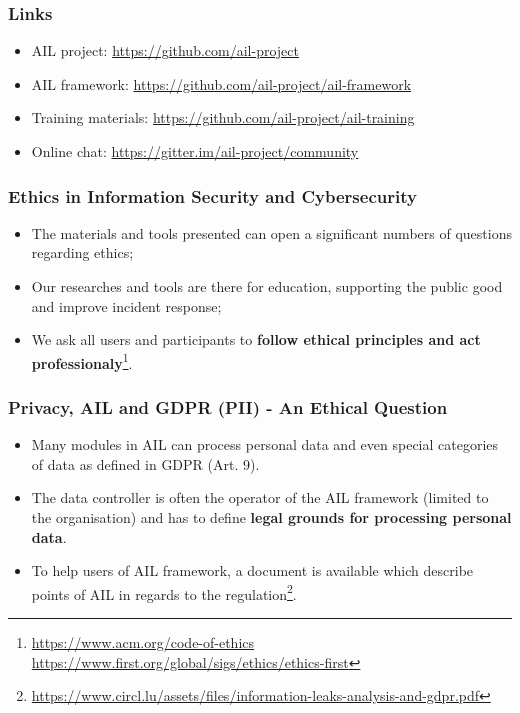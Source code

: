 \documentclass{beamer}
\begin{document}
\begin{frame}
\frametitle{Links}
    \begin{itemize}
        \item AIL project: \url{https://github.com/ail-project}
        \item AIL framework: \url{https://github.com/ail-project/ail-framework}
        \item Training materials: \url{https://github.com/ail-project/ail-training}
        \item Online chat: \url{https://gitter.im/ail-project/community}
    \end{itemize}
\end{frame}


\begin{frame}
        \frametitle{Ethics in Information Security and Cybersecurity}
        \begin{itemize}
        \item The materials and tools presented can open a significant numbers of questions regarding ethics;
        \item Our researches and tools are there for education, supporting the public good and improve incident response;
        \item We ask all users and participants to {\bf follow ethical principles and act professionaly}\footnote{\url{https://www.acm.org/code-of-ethics} \url{https://www.first.org/global/sigs/ethics/ethics-first}}.
        \end{itemize}
\end{frame}

\begin{frame}
        \frametitle{Privacy, AIL and GDPR (PII) - An Ethical Question}
        \begin{itemize}
                \item Many modules in AIL can process personal data and even special categories of data as defined in GDPR (Art. 9).
                \item The data controller is often the operator of the AIL framework (limited to the organisation) and has to define {\bf legal grounds for processing personal data}.
                \item To help users of AIL framework, a document is available which describe points of AIL in regards to the regulation\footnote{\url{https://www.circl.lu/assets/files/information-leaks-analysis-and-gdpr.pdf}}.
        \end{itemize}
\end{frame}
\end{document}

